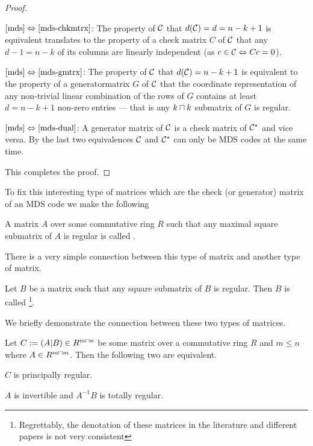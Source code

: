 \begin{proof}
    \begin{implications}
            \item[$\autoref{mds}\equival\autoref{mds-chkmtrx}$:]
        The property of $\mathcal{C}$ that $d(\mathcal{C})=d=n-k+1$ is equivalent translates to the property of a check matrix $C$ of $\mathcal{C}$ that any $d-1=n-k$ of its columns are linearly independent (as $c\in\mathcal{C}\Leftrightarrow Cc=0$).
            \item[$\autoref{mds}\equival\autoref{mds-gmtrx}$:]
        The property of $\mathcal{C}$ that $d(\mathcal{C})=n-k+1$ is equivalent to the property of a generatormatrix $G$ of $\mathcal{C}$ that the coordinate representation of any non-trivial linear combination of the rows of $G$ contains at least $d=n-k+1$ non-zero entries --- that is any $k\setprod k$ submatrix of $G$ is regular.
            \item[$\autoref{mds}\equival\autoref{mds-dual}$:]
        A generator matrix of $\mathcal{C}$ is a check matrix of $\mathcal{C}^{\ast}$ and vice versa. By the last two equivalences $\mathcal{C}$ and $\mathcal{C}^{\ast}$ can only be MDS codes at the same time. 
    \end{implications}
This completes the proof.
\end{proof}

To fix this interesting type of matrices which are the check (or generator) matrix of an MDS code we make the following

\begin{definition}
    A matrix $A$ over some commutative ring $R$ such that any maximal square submatrix of $A$ is regular is called .
\end{definition}

There is a very simple connection between this type of matrix and another type of matrix.

\begin{definition}
    Let $B$ be a matrix such that any square submatrix of $B$ is regular. Then $B$ is called \footnote{Regrettably, the denotation of these matrices in the literature and different papers is not very consistent}. 
\end{definition}

We briefly demonstrate the connection between these two types of matrices.

\begin{lemma}
    Let $C:=(A|B)\in R^{m\setprod n}$ be some matrix over a commutative ring $R$ and $m\leq n$ where $A\in R^{m\setprod m}$.
    Then the following two are equivalent.
    \begin{statements}
            \item $C$ is principally regular.
            \item $A$ is invertible and $A^{-1}B$ is totally regular.
    \end{statements}
\end{lemma}

